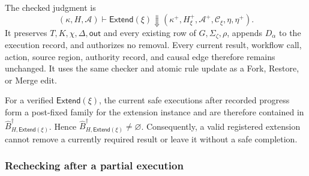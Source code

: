 The checked judgment is
\[
(\kappa,H,\mathcal A)\vdash\mathsf{Extend}(\xi)\Downarrow
  (\kappa^+,H_\xi^+,\mathcal A^+,\mathcal C_\xi,\eta,\eta^+).
\]
It preserves \(T,K,\chi,\Delta,\mathsf{out}\) and every existing row of \(G,\Sigma_\zeta,\rho\), appends \(D_\alpha\) to the execution record, and authorizes no removal.
Every current result, workflow call, action, source region, authority record, and causal edge therefore remains unchanged.
It uses the same checker and atomic rule update as a Fork, Restore, or Merge edit.

\begin{lemma}
\label{lem:live-extension}
For a verified \(\mathsf{Extend}(\xi)\), the current safe executions after recorded progress form a post-fixed family for the extension instance and are therefore contained in \(\widehat B^\dagger_{H,\mathsf{Extend}(\xi)}\).
Hence \(\widehat B^\dagger_{H,\mathsf{Extend}(\xi)}\ne\varnothing\).
Consequently, a valid registered extension cannot remove a currently required result or leave it without a safe completion.
\end{lemma}

\subsubsection{Rechecking after a partial execution}
\label{app:recheck-coherence-proof}

